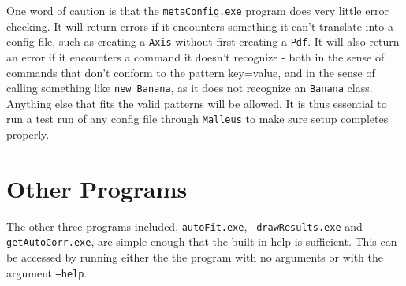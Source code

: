 One word of caution is that the {\tt metaConfig.exe} program does very
little error checking.  It will return errors if it encounters
something it can't translate into a config file, such as creating a
{\tt Axis} without first creating a {\tt Pdf}.  It will also return an
error if it encounters a command it doesn't recognize - both in the
sense of commands that don't conform to the pattern key=value, and in
the sense of calling something like {\tt new Banana}, as it does not
recognize an {\tt Banana} class.  Anything else that fits the valid
patterns will be allowed.  It is thus essential to run a test run of
any config file through {\tt Malleus} to make sure setup
completes properly.


\section{Other Programs}
\label{sec:otherProgs}
The other three programs included, {\tt autoFit.exe}, {\tt
drawResults.exe} and {\tt getAutoCorr.exe}, are simple enough that the
built-in help is sufficient.  This can be accessed by running either
the the program with no arguments or with the argument {\tt --help}.

